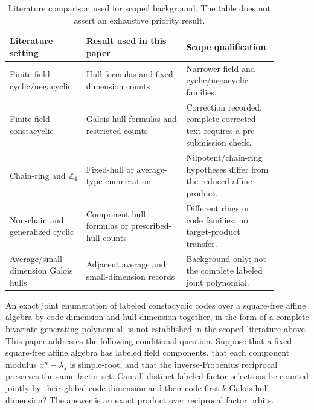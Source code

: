 \documentclass[11pt]{article}
\theoremstyle{plain}
\theoremstyle{definition}
\theoremstyle{remark}
\begin{document}
\begin{table}[ht]
\centering
\caption{Literature comparison used for scoped background. The table does not assert an exhaustive priority result.}
\label{tab:literature}
\scriptsize
\begin{tabular}{|L{0.23\linewidth}|L{0.34\linewidth}|L{0.31\linewidth}|}
\hline
Literature setting & Result used in this paper & Scope qualification \\
\hline
Finite-field cyclic/negacyclic & Hull formulas and fixed-dimension counts \cite{sangwisut2015} & Narrower field and cyclic/negacyclic families. \\
\hline
Finite-field constacyclic & Galois-hull formulas and restricted counts \cite{debnathConstacyclic2023,debnathCorrection2023} & Correction recorded; complete corrected text requires a pre-submission check. \\
\hline
Chain-ring and $\mathbb Z_4$ & Fixed-hull or average-type enumeration \cite{talbi2021,jitmanZ4,pathakZ4} & Nilpotent/chain-ring hypotheses differ from the reduced affine product. \\
\hline
Non-chain and generalized cyclic & Component hull formulas or prescribed-hull counts \cite{zhang2026,gao2023,aliabadi2026} & Different rings or code families; no target-product transfer. \\
\hline
Average/small-dimension Galois hulls & Adjacent average and small-dimension records \cite{debnathAverage2025,debnathSmall2026} & Background only; not the complete labeled joint polynomial. \\
\hline
\end{tabular}
\end{table}

An exact joint enumeration of labeled constacyclic codes over a square-free affine algebra by code dimension and hull dimension together, in the form of a complete bivariate generating polynomial, is not established in the scoped literature above. This paper addresses the following conditional question. Suppose that a fixed square-free affine algebra has labeled field components, that each component modulus $x^n-\lambda_s$ is simple-root, and that the inverse-Frobenius reciprocal preserves the same factor set. Can all distinct labeled factor selections be counted jointly by their global code dimension and their code-first $k$-Galois hull dimension? The answer is an exact product over reciprocal factor orbits.
\end{document}
